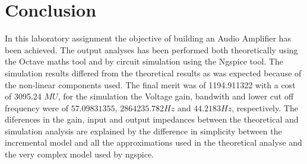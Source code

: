 \section{Conclusion}
\label{sec:conclusion}

In this laboratory assignment the objective of building an Audio Amplifier has been
achieved. The output analyses has been performed both
theoretically using the Octave maths tool and by circuit simulation using the
Ngspice tool. The simulation results differed from the theoretical results as was expected because of the non-linear components used. The final merit was of 1194.911322 with a cost of 3095.24 $MU$, for the simulation the Voltage gain, bandwith and lower cut off frequency were of $57.09831355$, $2864235.782 Hz$ and $44.2183Hz$, respectively.
The diferences in the gain, input and output impedances between the theoretical and simulation analysis are explained by the difference in simplicity between the incremental model and all the approximations used in the theoretical analyse and the very complex model used by ngspice.

